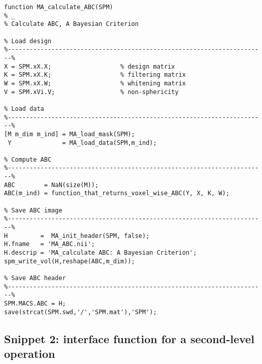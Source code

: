 \documentclass[a4paper,12pt]{article}
\begin{document}
\vspace{1em}
\begin{verbatim}
function MA_calculate_ABC(SPM)
% _
% Calculate ABC, A Bayesian Criterion

% Load design
%-----------------------------------------------------------------------%
X = SPM.xX.X;                   % design matrix
K = SPM.xX.K;                   % filtering matrix
W = SPM.xX.W;                   % whitening matrix
V = SPM.xVi.V;                  % non-sphericity

% Load data
%-----------------------------------------------------------------------%
[M m_dim m_ind] = MA_load_mask(SPM);
 Y              = MA_load_data(SPM,m_ind);

% Compute ABC
%-----------------------------------------------------------------------%
ABC        = NaN(size(M));
ABC(m_ind) = function_that_returns_voxel_wise_ABC(Y, X, K, W);

% Save ABC image
%-----------------------------------------------------------------------%
H         =  MA_init_header(SPM, false);
H.fname   = 'MA_ABC.nii';
H.descrip = 'MA_calculate ABC: A Bayesian Criterion';
spm_write_vol(H,reshape(ABC,m_dim));

% Save ABC header
%-----------------------------------------------------------------------%
SPM.MACS.ABC = H;
save(strcat(SPM.swd,'/','SPM.mat'),'SPM');
\end{verbatim}


\pagebreak
\subsection*{Snippet 2: interface function for a second-level operation} \label{sec:DEF-inter}
\end{document}
